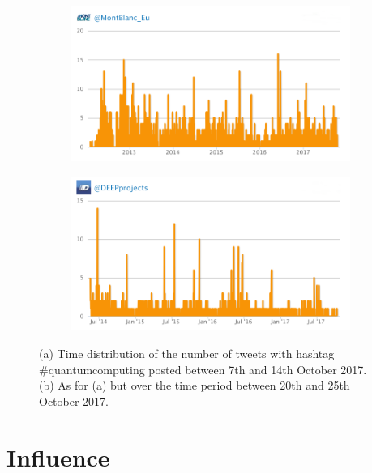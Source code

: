 \begin{figure}
 \centering
 \begin{subfigure}[t]{0.9\textwidth}
   \includegraphics[width=1\linewidth]{Images/Tweets_Montblanc.png}
   \caption{} 
 \end{subfigure}

 \begin{subfigure}[t]{0.9\textwidth}
   \includegraphics[width=1\linewidth]{Images/Tweets_Deepest.png}
   \caption{}
 \end{subfigure}
 \caption{(a) Time distribution of the number of tweets with hashtag \#quantumcomputing posted between 7th and 14th October 2017. (b) As for (a) but over the time period between 20th and 25th October 2017.} 
 \label{Tweets_Montblanc-Deepest}
\end{figure}

\section{Influence}

